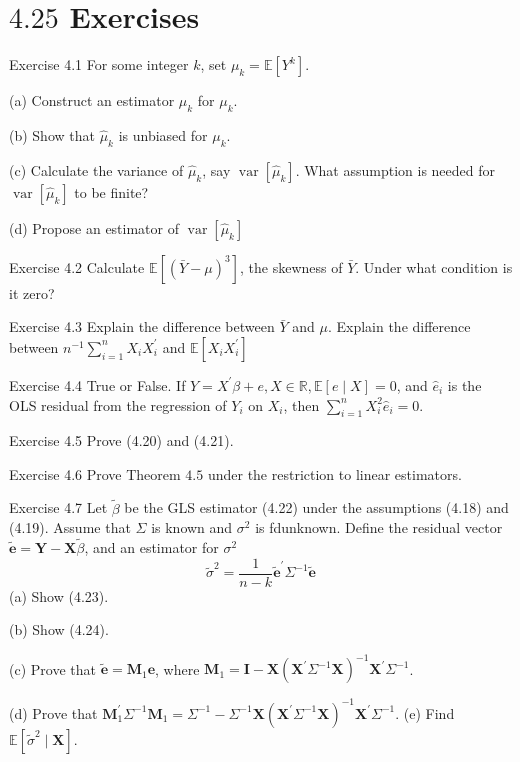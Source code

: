 \documentclass[10pt]{article}
\begin{document}
\section{$4.25$ Exercises}
Exercise 4.1 For some integer $k$, set $\mu_{k}=\mathbb{E}\left[Y^{k}\right]$.

(a) Construct an estimator $\widehat{\mu}_{k}$ for $\mu_{k}$.

(b) Show that $\widehat{\mu}_{k}$ is unbiased for $\mu_{k}$.

(c) Calculate the variance of $\widehat{\mu}_{k}$, say $\operatorname{var}\left[\widehat{\mu}_{k}\right]$. What assumption is needed for $\operatorname{var}\left[\widehat{\mu}_{k}\right]$ to be finite?

(d) Propose an estimator of $\operatorname{var}\left[\widehat{\mu}_{k}\right]$

Exercise 4.2 Calculate $\mathbb{E}\left[(\bar{Y}-\mu)^{3}\right]$, the skewness of $\bar{Y}$. Under what condition is it zero?

Exercise 4.3 Explain the difference between $\bar{Y}$ and $\mu$. Explain the difference between $n^{-1} \sum_{i=1}^{n} X_{i} X_{i}^{\prime}$ and $\mathbb{E}\left[X_{i} X_{i}^{\prime}\right]$

Exercise 4.4 True or False. If $Y=X^{\prime} \beta+e, X \in \mathbb{R}, \mathbb{E}[e \mid X]=0$, and $\widehat{e}_{i}$ is the OLS residual from the regression of $Y_{i}$ on $X_{i}$, then $\sum_{i=1}^{n} X_{i}^{2} \widehat{e}_{i}=0$.

Exercise 4.5 Prove (4.20) and (4.21).

Exercise 4.6 Prove Theorem $4.5$ under the restriction to linear estimators.

Exercise 4.7 Let $\widetilde{\beta}$ be the GLS estimator (4.22) under the assumptions (4.18) and (4.19). Assume that $\Sigma$ is known and $\sigma^{2}$ is fdunknown. Define the residual vector $\widetilde{\boldsymbol{e}}=\boldsymbol{Y}-\boldsymbol{X} \widetilde{\beta}$, and an estimator for $\sigma^{2}$
$$
\widetilde{\sigma}^{2}=\frac{1}{n-k} \widetilde{\boldsymbol{e}}^{\prime} \Sigma^{-1} \widetilde{\boldsymbol{e}}
$$
(a) Show (4.23).

(b) Show (4.24).

(c) Prove that $\widetilde{\boldsymbol{e}}=\boldsymbol{M}_{1} \boldsymbol{e}$, where $\boldsymbol{M}_{1}=\boldsymbol{I}-\boldsymbol{X}\left(\boldsymbol{X}^{\prime} \Sigma^{-1} \boldsymbol{X}\right)^{-1} \boldsymbol{X}^{\prime} \Sigma^{-1}$.

(d) Prove that $\boldsymbol{M}_{1}^{\prime} \Sigma^{-1} \boldsymbol{M}_{1}=\Sigma^{-1}-\Sigma^{-1} \boldsymbol{X}\left(\boldsymbol{X}^{\prime} \Sigma^{-1} \boldsymbol{X}\right)^{-1} \boldsymbol{X}^{\prime} \Sigma^{-1}$. (e) Find $\mathbb{E}\left[\widetilde{\sigma}^{2} \mid \boldsymbol{X}\right]$.
\end{document}
